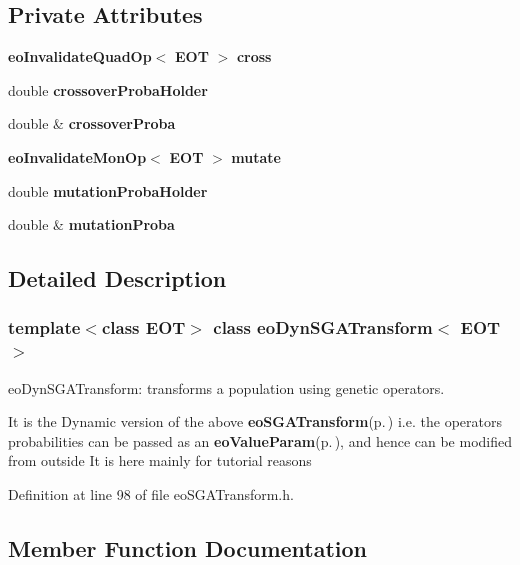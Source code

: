 \subsection*{Private Attributes}
\begin{CompactItemize}
\item 
{\bf eo\-Invalidate\-Quad\-Op}$<$ {\bf EOT} $>$ {\bf cross}\label{classeo_dyn_s_g_a_transform_r0}

\item 
double {\bf crossover\-Proba\-Holder}\label{classeo_dyn_s_g_a_transform_r1}

\item 
double \& {\bf crossover\-Proba}\label{classeo_dyn_s_g_a_transform_r2}

\item 
{\bf eo\-Invalidate\-Mon\-Op}$<$ {\bf EOT} $>$ {\bf mutate}\label{classeo_dyn_s_g_a_transform_r3}

\item 
double {\bf mutation\-Proba\-Holder}\label{classeo_dyn_s_g_a_transform_r4}

\item 
double \& {\bf mutation\-Proba}\label{classeo_dyn_s_g_a_transform_r5}

\end{CompactItemize}


\subsection{Detailed Description}
\subsubsection*{template$<$class EOT$>$ class eo\-Dyn\-SGATransform$<$ EOT $>$}

eo\-Dyn\-SGATransform: transforms a population using genetic operators. 

It is the Dynamic version of the above {\bf eo\-SGATransform}{\rm (p.\,\pageref{classeo_s_g_a_transform})} i.e. the operators probabilities can be passed as an {\bf eo\-Value\-Param}{\rm (p.\,\pageref{classeo_value_param})}, and hence can be modified from outside It is here mainly for tutorial reasons 



Definition at line 98 of file eo\-SGATransform.h.

\subsection{Member Function Documentation}

